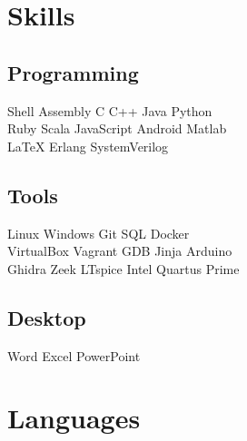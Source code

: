 \documentclass[]{deedy-resume-openfont}
\begin{document}
\begin{minipage}[t]{0.35\textwidth}


\section{Skills}
\subsection{Programming}
Shell \textbullet{} Assembly \textbullet{} C \textbullet{} C++ \textbullet{} Java \textbullet{} Python \\
Ruby \textbullet{} Scala \textbullet{} JavaScript \textbullet{} Android \textbullet{} Matlab \\
\LaTeX \textbullet{} Erlang \textbullet{} SystemVerilog

\subsection{Tools}
Linux \textbullet{} Windows \textbullet{} Git \textbullet{} SQL \textbullet{} Docker \\
VirtualBox \textbullet{} Vagrant \textbullet{} GDB \textbullet{} Jinja \textbullet{} Arduino \\
Ghidra \textbullet{} Zeek \textbullet{} LTspice \textbullet{} Intel Quartus Prime

\subsection{Desktop}
Word \textbullet{} Excel \textbullet{} PowerPoint

\section{Languages}


\end{minipage}
\end{document}
